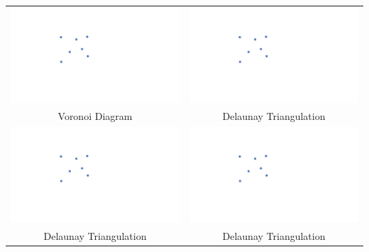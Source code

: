 \documentclass[a4paper,12pt]{article}
\begin{document}
\begin{tabular}{|c|c|}
\hline
\hspace{10pt}\includegraphics[width=0.425\linewidth]{../images/voronoi7.pdf}\hspace{10pt} & \hspace{10pt}\includegraphics[width=0.425\linewidth]{../images/voronoi7.pdf}\hspace{10pt} \\
Voronoi Diagram & Delaunay Triangulation \\
\hline
\hspace{10pt}\includegraphics[width=0.425\linewidth]{../images/voronoi7.pdf}\hspace{10pt} & \hspace{10pt}\includegraphics[width=0.425\linewidth]{../images/voronoi7.pdf}\hspace{10pt} \\
Delaunay Triangulation & Delaunay Triangulation \\
\hline
\end{tabular}
\end{document}
